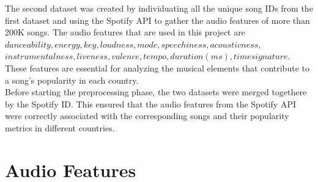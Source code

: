  The second dataset was created by individuating all the unique song IDs from the first dataset and using the Spotify API to gather the audio features of more than 200K songs. The audio features that are used in this project are $danceability, energy, key, loudness, mode, speechiness, acousticness$, 
 $instrumentalness, liveness, valence, tempo, duration (ms), time signature$.  
 These features are essential for analyzing the musical elements that contribute to a song's popularity in each country.\\

 Before starting the preprocessing phase, the two datasets were merged togethere by the Spotify ID. This ensured that the audio features from the Spotify API were 
 correctly associated with the corresponding songs and their popularity metrics in different countries.\\


\newpage
 \section{Audio Features}

